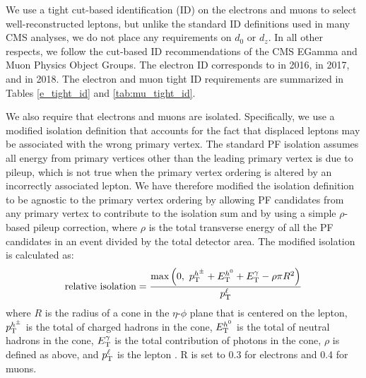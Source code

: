 



We use a tight cut-based identification (ID) on the electrons and muons to select well-reconstructed leptons, but unlike the standard ID definitions used in many CMS analyses, we do not place any requirements on $d_0$ or $d_z$. In all other respects, we follow the cut-based ID recommendations of the CMS EGamma and Muon Physics Object Groups. The electron ID corresponds to  in 2016,  in 2017, and  in 2018. The electron and muon tight ID requirements are summarized in Tables \ref{e_tight_id} and \ref{tab:mu_tight_id}.




We also require that electrons and muons are isolated. Specifically, we use a modified isolation definition that accounts for the fact that displaced leptons may be associated with the wrong primary vertex. The standard PF isolation assumes all energy from primary vertices other than the leading primary vertex is due to pileup, which is not true when the primary vertex ordering is altered by an incorrectly associated lepton. We have therefore modified the isolation definition to be agnostic to the primary vertex ordering by allowing PF candidates from any primary vertex to contribute to the isolation sum and by using a simple $\rho$-based pileup correction, where $\rho$ is the total transverse energy of all the PF candidates in an event divided by the total detector area. The modified isolation is calculated as:
\begin{equation}
    \text{relative isolation} = \frac{\text{max}\left(0,\ p_{\mathrm{T}}^{h^{\pm}} + E_{\mathrm{T}}^{h^0} + E_{\mathrm{T}}^{\gamma} - \rho\pi R^2\right)}{p_{\mathrm{T}}^{\ell}}
\end{equation}
where $R$ is the radius of a cone in the $\eta$-$\phi$ plane that is centered on the lepton, $p_{\mathrm{T}}^{h^{\pm}}$ is the total \pt of charged hadrons in the cone, $E_{\mathrm{T}}^{h^0}$ is the total \ET of neutral hadrons in the cone, $E_{\mathrm{T}}^{\gamma}$ is the total contribution of photons in the cone, $\rho$ is defined as above, and $p_{\mathrm{T}}^{\ell}$ is the lepton \pt. R is set to \num{0.3} for electrons and \num{0.4} for muons.

